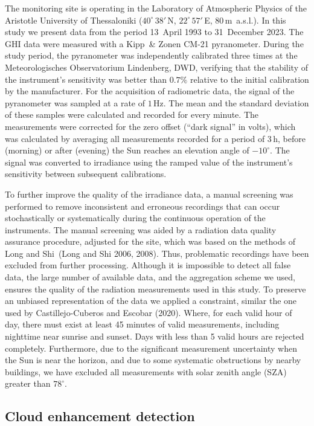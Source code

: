 \documentclass[
]{article}
\begin{document}
The monitoring site is operating in the Laboratory of Atmospheric Physics of the
Aristotle University of Thessaloniki (\(40^\circ\,38'\,\)N,
\(22^\circ\,57'\,\)E, \(80\,\)m~a.s.l.).
In this study we present data from the period
13~April 1993 to
31~December 2023.
The GHI data were measured with a Kipp~\& Zonen CM-21 pyranometer. During the study
period, the pyranometer was independently calibrated three times at the
Meteorologisches Observatorium Lindenberg, DWD, verifying that the stability of the
instrument's sensitivity was better than \(0.7\%\) relative to the initial calibration
by the manufacturer.
For the acquisition of radiometric data, the signal of the pyranometer was sampled at
a rate of \(1\,\text{Hz}\). The mean and the standard deviation of these samples were
calculated and recorded for every minute. The measurements were corrected for the
zero offset (``dark signal'' in volts), which was calculated by averaging all
measurements recorded for a period of \(3\,\text{h}\), before (morning) or after
(evening) the Sun reaches an elevation angle of \(-10^\circ\). The signal was
converted to irradiance using the ramped value of the instrument's sensitivity
between subsequent calibrations.

To further improve the quality of the irradiance data, a manual screening was
performed to remove inconsistent and erroneous recordings that can occur
stochastically or systematically during the continuous operation of the instruments.
The manual screening was aided by a radiation data quality assurance procedure,
adjusted for the site, which was based on the methods of Long and Shi~(Long and Shi 2006, 2008). Thus, problematic recordings have been excluded from further
processing. Although it is impossible to detect all false data, the large number of
available data, and the aggregation scheme we used, ensures the quality of the
radiation measurements used in this study.
To preserve an unbiased representation of the data we applied a constraint, similar
the one used by Castillejo-Cuberos and Escobar (2020). Where, for each valid hour of day, there must
exist at least 45 minutes of valid measurements, including nighttime near sunrise and
sunset. Days with less than 5 valid hours are rejected completely.
Furthermore, due to the significant measurement uncertainty when the Sun is near the
horizon, and due to some systematic obstructions by nearby buildings, we have
excluded all measurements with solar zenith angle (SZA) greater than
\(78^\circ\).

\hypertarget{cloud-enhancement-detection}{%
\subsection{Cloud enhancement detection}\label{cloud-enhancement-detection}}
\end{document}

